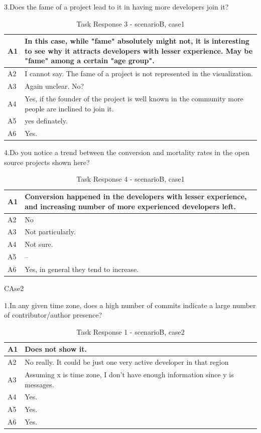 \documentclass[seploa]{beavtex}
\begin{document}
3.Does the fame of a project lead to it in having more developers join it?	

\begin{table}[H]
\begin{tabular}{ |p{2cm}|p{12cm}| }
 \hline
 A1 & In this case, while "fame" absolutely might not, it is interesting to see why it attracts developers with lesser experience. May be "fame" among a certain "age group".\\
 \hline
 A2 & I cannot say. The fame of a project is not represented in the visualization.\\ \hline
 A3 & Again unclear. No?\\ \hline
 A4 & Yes, if the founder of the project is well known in the community more people are inclined to join it.\\ \hline
 A5 & yes definately.\\ \hline
 A6 & Yes.\\
 \hline
\end{tabular}
\caption{Task Response 3 - scenarioB, case1}
\label{tab:table23}
\end{table}

4.Do you notice a trend between the conversion and mortality rates in the open source projects shown here?

\begin{table}[H]
\begin{tabular}{ |p{2cm}|p{12cm}| }
 \hline
 A1 & Conversion happened in the developers with lesser experience, and increasing number of more experienced developers left.\\
 \hline
 A2 & No\\ \hline
 A3 & Not particularly.\\ \hline
 A4 & Not sure.\\ \hline
 A5 & --\\ \hline
 A6 & Yes, in general they tend to increase.\\
 \hline
\end{tabular}
\caption{Task Response 4 - scenarioB, case1}
\label{tab:table24}
\end{table}

CAse2

1.In any given time zone, does a high number of commits indicate a large number of contributor/author presence?	

\begin{table}[H]
\begin{tabular}{ |p{2cm}|p{12cm}| }
 \hline
 A1 & Does not show it.\\
 \hline
 A2 & No really. It could be just one very active developer in that region\\ \hline
 A3 & Assuming x is time zone, I don't have enough information since y is messages.\\ \hline
 A4 & Yes.\\ \hline
 A5 & Yes.\\ \hline
 A6 & Yes.\\
 \hline
\end{tabular}
\caption{Task Response 1 - scenarioB, case2}
\label{tab:table31}
\end{table}
\end{document}
